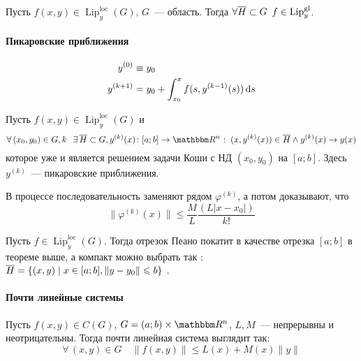 \documentclass[10pt, timbord]{../notes}
\DeclareMathOperator{\Lip}{Lip}
\newcommand{\liploc}[1]{\Lip_{#1}^{\mathrm{loc}}}
\newcommand{\lipgl}[1]{\Lip_{#1}^{\mathrm{gl}}}
\newcommand*{\ov}[2]{
  \IfEqCase{#1}{%
    {~}{\widetilde{#2}}%
    {-}{\overline{#2}}%
    {^}{\widehat{#2}}%
  }[\PackageError{tmath}{Undefined option to ov: #1}{}]%
}
\begin{document}
\begin{lem}\label{lem:sys::lipcon}
  Пусть $f(x,y) \in \liploc{y}(G)$, $G$~--- область. Тогда $\forall \ov-{H} \subset G 
  \;\: f\in \lipgl{y}$. 
\end{lem}

\paragraph{Пикаровские приближения}
\label{par:pik}


\begin{defn}\label{defn:pik}
  \begin{align*}
    y^{(0)} &\equiv y_0 \\
    y^{(k+1)} &= y_0  + \int_{x_0}^x f(s, y^{(k-1)}(s))\, \mathrm{d} s 
  \end{align*}
\end{defn}

\begin{thrm}[Пикара]\label{thrm:pik}
  Пусть $f(x,y) \in \liploc{y}(G)$ и 
  \[
    \forall\, (x_0, y_0) \in G, k \;\:\: \exists\, \ov{-} H \subset G, y^{(k)}(x) \colon [a;b] 
    \to \R^n \:\colon \: (x, y^{(k)}(x)) \in \ov{-} H  \land y^{(k)}(x) \to y(x)
  \]
  которое уже и является решением задачи Коши с НД $(x_0, y_0)$ на $[a;b]$. Здесь $y^{(k)}$~--- пикаровские
  приближения.
\end{thrm}
\begin{ittproof}
  В процессе последовательность заменяют рядом $\varphi^{(k)}$, а потом доказывают, что 
  \[
    \|\varphi^{(k)}(x)\| \leqslant \frac{M}{L} \frac{(L|x-x_0|)}{k!}
  \]
\end{ittproof}

\begin{thrm}\label{thrm:pikex}
  Пусть $f\in \liploc{y}(G)$. Тогда отрезок Пеано покатит в качестве отрезка $[a;b]$ в теореме выше,
  а компакт можно выбрать так : $\ov{-} H = \{(x,y) \mid x\in [a;b], \|y-y_0\| \leqslant b\}$ .
\end{thrm}

\paragraph{Почти линейные системы}

\begin{defn}\label{defn:plin}
  Пусть $f(x,y) \in C(G)$, $G = (a;b) \times \R^n$, $L,M$~--- непрерывны и неотрицательны. Тогда
  почти линейная система выглядит так:
  \[
    \forall\,(x,y) \in G \quad \|f(x,y)\| \leqslant L(x) + M(x) \|y\|
  \]
\end{defn}
\end{document}
